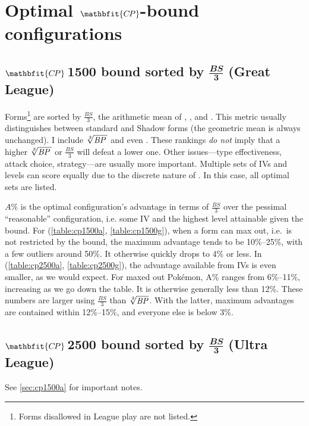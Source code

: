 \chapter{Optimal $\mathbfit{C\kern -1pt P}$-bound configurations\label{chap:optimal}}
\section[\CP1500 bound sorted by $\frac{\mathit{BS}}{3}$ (Great League)]%
{$\mathbfit{C\kern -1ptP}$\,1500 bound sorted by $\frac{\mathbfit{BS}}{\mathbf3}$ (Great League)\label{sec:cp1500a}}

Forms\footnote{Forms disallowed in League play are not listed.} are sorted by $\frac{\mathit{BS}}{3}$,
  the arithmetic mean of , , and \MHP\@.
This metric usually distinguishes between standard and Shadow forms (the geometric mean is always unchanged).
I include $\sqrt[3]{\mbox{$\mathit{BP}$}\,}$ and even \CP\@.
These rankings \textit{do not} imply that a higher $\sqrt[3]{\mbox{$\mathit{BP}$}\,}$ or $\frac{\mathit{BS}}{3}$
  will defeat a lower one.
Other issues---type effectiveness, attack choice, strategy---are usually more important.
Multiple sets of IVs and levels can score equally due to the discrete nature of \MHP\@.
In this case, all optimal sets are listed.

$A\%$ is the optimal configuration's advantage in terms of $\frac{BS}{3}$
  over the pessimal ``reasonable'' configuration, i.e. some IV
  and the highest level attainable given the \CP{} bound.
For  (\autoref{table:cp1500a}, \autoref{table:cp1500g}), when a form can max out, i.e.\ is not restricted by the \CP{} bound,
  the maximum advantage tends to be 10\%--25\%, with a few outliers around 50\%.
It otherwise quickly drops to 4\% or less.
In  (\autoref{table:cp2500a}, \autoref{table:cp2500g}), the advantage available from IVs is even smaller, as we would expect.
For maxed out Pokémon, A\% ranges from 6\%--11\%, increasing as we go down the table.
It is otherwise generally less than 12\%.
These numbers are larger using $\frac{\mathit{BS}}{3}$ than $\sqrt[3]{\mbox{$\mathit{BP}$}}$.
With the latter, maximum advantages are contained within 12\%--15\%, and everyone else is below 3\%.

\section[\CP2500 bound sorted by $\frac{\mathit{BS}}{3}$ (Ultra League)]%
{$\mathbfit{C\kern -1ptP}$\,2500 bound sorted by $\frac{\mathbfit{BS}}{\mathbf3}$ (Ultra League)}
See \autoref{sec:cp1500a} for important notes.

